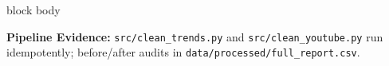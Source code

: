 \documentclass[aspectratio=169, 10pt]{beamer}
\newenvironment{card}[1][]{%
        \begin{beamercolorbox}[rounded=true,shadow=false,wd=\linewidth,sep=3.5pt,#1]{block body}%
        \fontsize{7.8pt}{9.8pt}\selectfont%
    }{%
        \end{beamercolorbox}%
    }
\begin{document}
\begin{frame}[t]
        \vspace{0.15cm}                                                                                                                                                                                
        \begin{card}                                                                                                                                                                                   
            \centering\scriptsize                                                                                                                                                                      
            \textbf{Pipeline Evidence:} \texttt{src/clean\_trends.py} and \texttt{src/clean\_youtube.py} run idempotently; before/after audits in \texttt{data/processed/full\_report.csv}.            
        \end{card}                                                                                                                                                                                     
    \end{frame}                                                                                                                                                                                        
                                                                                                                                                                                                       
\end{document}

